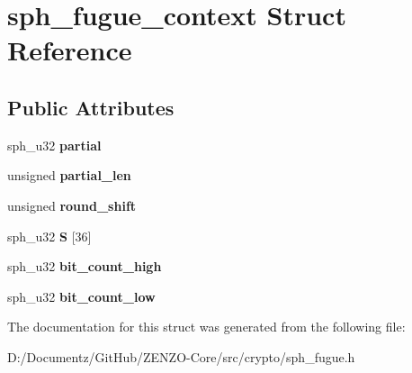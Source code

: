 \hypertarget{structsph__fugue__context}{}\section{sph\+\_\+fugue\+\_\+context Struct Reference}
\label{structsph__fugue__context}
\subsection*{Public Attributes}
\begin{DoxyCompactItemize}
\item 
\mbox{\label{structsph__fugue__context_ac2376b224565b7f8ba5ac3f44a610073}} 
sph\+\_\+u32 {\bfseries partial}
\item 
\mbox{\label{structsph__fugue__context_a9e39b033b9ce03fc86b39438891fd39b}} 
unsigned {\bfseries partial\+\_\+len}
\item 
\mbox{\label{structsph__fugue__context_aba5f9b3ec6500d9dea35840536c98674}} 
unsigned {\bfseries round\+\_\+shift}
\item 
\mbox{\label{structsph__fugue__context_a04633ca61fcf330cea60d25d06edec62}} 
sph\+\_\+u32 {\bfseries S} \mbox{[}36\mbox{]}
\item 
\mbox{\label{structsph__fugue__context_ac5bfc330fd0f8689ca2a172ef7a32340}} 
sph\+\_\+u32 {\bfseries bit\+\_\+count\+\_\+high}
\item 
\mbox{\label{structsph__fugue__context_ab42151f424c51cbce42ceae8d021b0fa}} 
sph\+\_\+u32 {\bfseries bit\+\_\+count\+\_\+low}
\end{DoxyCompactItemize}


The documentation for this struct was generated from the following file\+:\begin{DoxyCompactItemize}
\item 
D\+:/\+Documentz/\+Git\+Hub/\+Z\+E\+N\+Z\+O-\/\+Core/src/crypto/sph\+\_\+fugue.\+h\end{DoxyCompactItemize}
